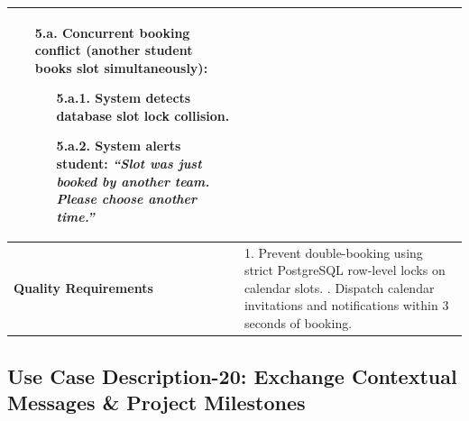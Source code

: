 \begin{table}[H]
\begin{tabularx}{\textwidth}{|l|X|}
\begin{itemize}[leftmargin=*]
    \item[\textbf{5.a.}] \textbf{Concurrent booking conflict (another student books slot simultaneously):}
    \begin{itemize}[leftmargin=*]
        \item[5.a.1.] System detects database slot lock collision.
        \item[5.a.2.] System alerts student: \textit{``Slot was just booked by another team. Please choose another time.''}
    \end{itemize}
\end{itemize} \\ \hline
\textbf{Quality Requirements} & 
1. Prevent double-booking using strict PostgreSQL row-level locks on calendar slots. \newline
2. Dispatch calendar invitations and notifications within 3 seconds of booking. \\ \hline
\end{tabularx}
\end{table}

\clearpage
\subsection{Use Case Description-20: Exchange Contextual Messages \& Project Milestones}
\label{subsec:uc20}

